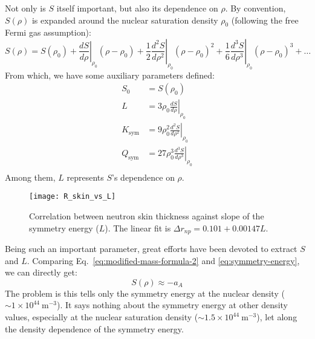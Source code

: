 Not only is $S$ itself important, but also its dependence on $\rho$. 
By convention, $S(\rho)$ is expanded around the nuclear saturation density $\rho_0$
(following the free Fermi gas assumption):
\begin{equation}
    S(\rho) = S(\rho_0) 
    + \left.\frac{dS}{d\rho}\right|_{\rho_0}(\rho - \rho_0)
    + \frac{1}{2}\left.\frac{d^2S}{d\rho^2}\right|_{\rho_0}(\rho - \rho_0)^2
    + \frac{1}{6}\left.\frac{d^3S}{d\rho^3}\right|_{\rho_0}(\rho - \rho_0)^3
    + \dots
\end{equation}
From which, we have some auxiliary parameters defined:
\begin{equation}
    \begin{aligned}
	S_0 &= S(\rho_0)	\\
	L   &= 3\rho_0\left.\frac{dS}{d\rho}\right|_{\rho_0}	\\
	K_{\text{sym}}	&= 9\rho_0^2\left.\frac{d^2S}{d\rho^2}\right|_{\rho_0}	\\
	Q_{\text{sym}}	&= 27\rho_0^3\left.\frac{d^3S}{d\rho^3}\right|_{\rho_0}	\\
    \end{aligned}
\end{equation}
Among them, $L$ represents $S$'s dependence on $\rho$.
\begin{figure}[!h]
    \centering
    \texttt{[image: R\_skin\_vs\_L]}
    \caption{Correlation between \Pb neutron skin thickness against slope of the
    symmetry energy ($L$). The linear fit is $\Delta r_{np} = 0.101 + 0.00147 L$.
    \cite{PhysRevLett.106.252501}}
\end{figure}

Being such an important parameter, great efforts have been devoted to extract $S$ 
and $L$. Comparing Eq.~\ref{eq:modified-mass-formula-2} and \ref{eq:symmetry-energy},
we can directly get:
\begin{equation}
    S(\rho) \approx -a_A
\end{equation}
The problem is this tells only the symmetry energy at the nuclear density ($\sim 1 \times 10^{44}\ \mathrm{m}^{-3}$).
It says nothing about the symmetry energy at other density values, especially at the nuclear
saturation density ($\sim 1.5 \times 10^{44}\ \mathrm{m}^{-3}$), let along the density
dependence of the symmetry energy. 

